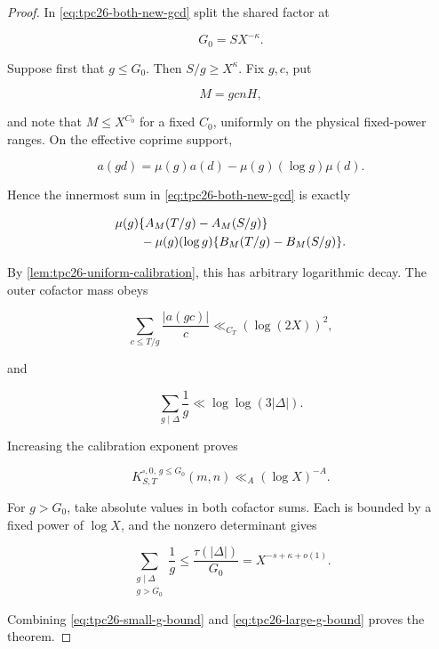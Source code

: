 \begin{proof}
In \eqref{eq:tpc26-both-new-gcd} split the shared factor at

\begin{equation}
 G_0=SX^{-\kappa}.
 \label{eq:tpc26-G0}
\end{equation}

Suppose first that \(g\le G_0\).  Then \(S/g\ge X^\kappa\).  Fix
\(g,c\), put

\begin{equation}
 M=gcnH,
 \label{eq:tpc26-small-g-M}
\end{equation}

and note that \(M\le X^{C_0}\) for a fixed \(C_0\), uniformly on the
physical fixed-power ranges.  On the effective coprime support,

\begin{equation}
 a(gd)=\mu(g)a(d)-\mu(g)(\log g)\mu(d).
 \label{eq:tpc26-agd-split}
\end{equation}

Hence the innermost sum in \eqref{eq:tpc26-both-new-gcd} is exactly

\begin{align}
 &\mu(g)\{A_M(T/g)-A_M(S/g)\}
 \notag\\
 &\qquad
 -\mu(g)(\log g)\{B_M(T/g)-B_M(S/g)\}.
 \label{eq:tpc26-inner-endpoint}
\end{align}

By \cref{lem:tpc26-uniform-calibration}, this has arbitrary
logarithmic decay.  The outer cofactor mass obeys

\begin{equation}
 \sum_{c\le T/g}\frac{|a(gc)|}{c}
 \ll_{C_T}(\log(2X))^2,
 \label{eq:tpc26-outer-mass}
\end{equation}

and

\[
 \sum_{g\mid\Delta}\frac1g\ll\log\log(3|\Delta|).
\]

Increasing the calibration exponent proves

\begin{equation}
 K^{\square,0,\,g\le G_0}_{S,T}(m,n)
 \ll_A(\log X)^{-A}.
 \label{eq:tpc26-small-g-bound}
\end{equation}

For \(g>G_0\), take absolute values in both cofactor sums.  Each is
bounded by a fixed power of \(\log X\), and the nonzero determinant
gives

\begin{equation}
 \sum_{\substack{g\mid\Delta\\g>G_0}}\frac1g
 \le\frac{\tau(|\Delta|)}{G_0}
 =X^{-s+\kappa+o(1)}.
 \label{eq:tpc26-large-g-bound}
\end{equation}

Combining \eqref{eq:tpc26-small-g-bound} and
\eqref{eq:tpc26-large-g-bound} proves the theorem.
\end{proof}

